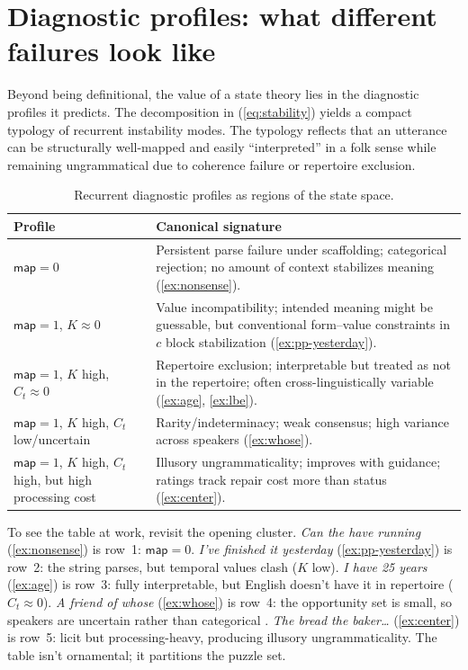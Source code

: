 \documentclass[12pt,letterpaper]{article}
\newcommand{\mention}[1]{\textit{#1}}
\begin{document}
\section{Diagnostic profiles: what different failures look like}\label{sec:profiles}

Beyond being definitional, the value of a state theory lies in the diagnostic profiles it predicts. The decomposition in (\ref{eq:stability}) yields a compact typology of recurrent instability modes. The typology reflects that an utterance can be structurally well-mapped and easily \enquote{interpreted} in a folk sense while remaining ungrammatical due to coherence failure or repertoire exclusion.

\begin{table}[H]
\centering
\begin{tabular}{@{}p{4.2cm}p{7.8cm}@{}}
\toprule
Profile & Canonical signature\\
\midrule
$\mathsf{map}=0$ & Persistent parse failure under scaffolding; categorical rejection; no amount of context stabilizes meaning (\ref{ex:nonsense}).\\[4pt]
$\mathsf{map}=1$, $K\approx 0$ & Value incompatibility; intended meaning might be guessable, but conventional form--value constraints in $c$ block stabilization (\ref{ex:pp-yesterday}).\\[4pt]
$\mathsf{map}=1$, $K$ high, $C_t\approx 0$ & Repertoire exclusion; interpretable but treated as not in the repertoire; often cross-linguistically variable (\ref{ex:age}, \ref{ex:lbe}).\\[4pt]
$\mathsf{map}=1$, $K$ high, $C_t$ low/uncertain & Rarity/indeterminacy; weak consensus; high variance across speakers (\ref{ex:whose}).\\[4pt]
$\mathsf{map}=1$, $K$ high, $C_t$ high, but high processing cost & Illusory ungrammaticality; improves with guidance; ratings track repair cost more than status (\ref{ex:center}).\\
\bottomrule
\end{tabular}
\caption{Recurrent diagnostic profiles as regions of the state space.}
\label{tab:profiles}
\end{table}

To see the table at work, revisit the opening cluster. \mention{Can the have running} (\ref{ex:nonsense}) is row~1: $\mathsf{map}=0$. \mention{I've finished it yesterday} (\ref{ex:pp-yesterday}) is row~2: the string parses, but temporal values clash ($K$ low). \mention{I have 25 years} (\ref{ex:age}) is row~3: fully interpretable, but English doesn't have it in repertoire ($C_t\approx 0$). \mention{A friend of whose} (\ref{ex:whose}) is row~4: the opportunity set is small, so speakers are uncertain rather than categorical \autocite{reynolds2024whose}. \mention{The bread the baker\ldots} (\ref{ex:center}) is row~5: licit but processing-heavy, producing illusory ungrammaticality. The table isn't ornamental; it partitions the puzzle set.
\end{document}
